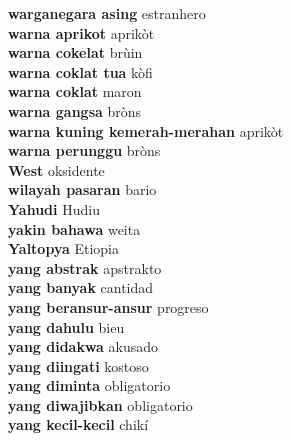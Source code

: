 \textbf{ warganegara asing  } estranhero \\
\textbf{ warna aprikot  } aprikòt \\
\textbf{ warna cokelat  } brùin \\
\textbf{ warna coklat tua  } kòfi \\
\textbf{ warna coklat  } maron \\
\textbf{ warna gangsa  } bròns \\
\textbf{ warna kuning kemerah-merahan  } aprikòt \\
\textbf{ warna perunggu  } bròns \\
\textbf{ West  } oksidente \\
\textbf{ wilayah pasaran  } bario \\
\textbf{ Yahudi  } Hudiu \\
\textbf{ yakin bahawa  } weita \\
\textbf{ Yaltopya  } Etiopia \\
\textbf{ yang abstrak  } apstrakto \\
\textbf{ yang banyak  } cantidad \\
\textbf{ yang beransur-ansur  } progreso \\
\textbf{ yang dahulu  } bieu \\
\textbf{ yang didakwa  } akusado \\
\textbf{ yang diingati  } kostoso \\
\textbf{ yang diminta  } obligatorio \\
\textbf{ yang diwajibkan  } obligatorio \\
\textbf{ yang kecil-kecil  } chikí \\
